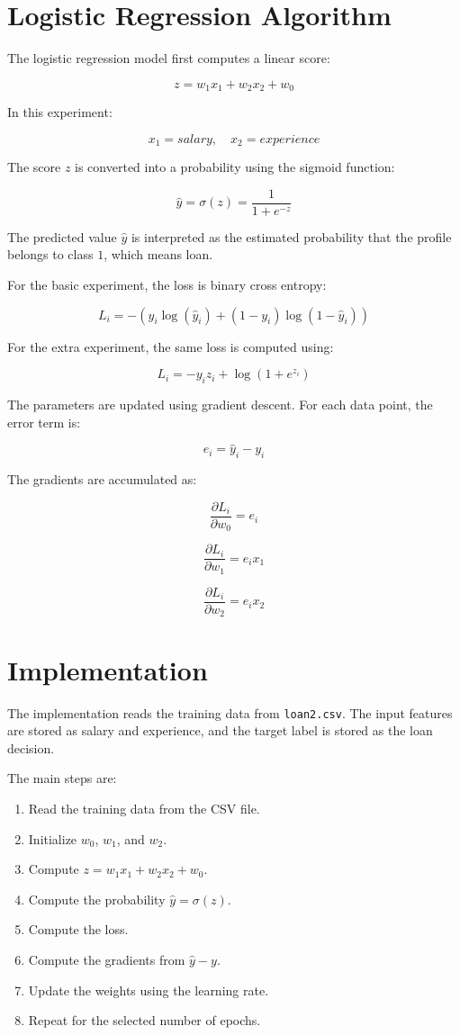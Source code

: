 \documentclass[12pt,a4paper]{article}
\begin{document}
\section{Logistic Regression Algorithm}

The logistic regression model first computes a linear score:

\[
z = w_1x_1 + w_2x_2 + w_0
\]

In this experiment:

\[
x_1 = salary, \quad x_2 = experience
\]

The score \(z\) is converted into a probability using the sigmoid function:

\[
\hat{y} = \sigma(z) = \frac{1}{1 + e^{-z}}
\]

The predicted value \(\hat{y}\) is interpreted as the estimated probability that the profile belongs to class \(1\), which means loan.

For the basic experiment, the loss is binary cross entropy:

\[
L_i = -(y_i\log(\hat{y}_i) + (1-y_i)\log(1-\hat{y}_i))
\]

For the extra experiment, the same loss is computed using:

\[
L_i = -y_i z_i + \log(1 + e^{z_i})
\]

The parameters are updated using gradient descent. For each data point, the error term is:

\[
e_i = \hat{y}_i - y_i
\]

The gradients are accumulated as:

\[
\frac{\partial L_i}{\partial w_0} = e_i
\]

\[
\frac{\partial L_i}{\partial w_1} = e_i x_1
\]

\[
\frac{\partial L_i}{\partial w_2} = e_i x_2
\]

\section{Implementation}

The implementation reads the training data from \texttt{loan2.csv}. The input features are stored as salary and experience, and the target label is stored as the loan decision.

The main steps are:

\begin{enumerate}
  \item Read the training data from the CSV file.
  \item Initialize \(w_0\), \(w_1\), and \(w_2\).
  \item Compute \(z = w_1x_1 + w_2x_2 + w_0\).
  \item Compute the probability \(\hat{y} = \sigma(z)\).
  \item Compute the loss.
  \item Compute the gradients from \(\hat{y}-y\).
  \item Update the weights using the learning rate.
  \item Repeat for the selected number of epochs.
\end{enumerate}
\end{document}
